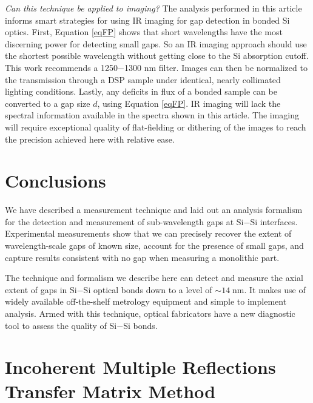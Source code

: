 \emph{Can this technique be applied to imaging?}  The analysis performed in this article informs smart strategies for using IR imaging for gap detection in bonded Si optics.  First, Equation \ref{eqFP} shows that short wavelengths have the most discerning power for detecting small gaps.  So an IR imaging approach should use the shortest possible wavelength without getting close to the Si absorption cutoff.  This work recommends a 1250$-$1300 nm filter.  Images can then be normalized to the transmission through a DSP sample under identical, nearly collimated lighting conditions.  Lastly, any deficits in flux of a bonded sample can be converted to a gap size $d$, using Equation \ref{eqFP}.  IR imaging will lack the spectral information available in the spectra shown in this article.  The imaging will require exceptional quality of flat-fielding or dithering of the images to reach the precision achieved here with relative ease.  

\section{Conclusions}
We have described a measurement technique and laid out an analysis formalism for the detection and measurement of sub-wavelength gaps at Si$-$Si interfaces.  Experimental measurements show that we can precisely recover the extent of wavelength-scale gaps of known size, account for the presence of small gaps, and capture results consistent with no gap when measuring a monolithic part.

The technique and formalism we describe here can detect and measure the axial extent of gaps in Si$-$Si optical bonds down to a level of $\sim14\;$nm.  It makes use of widely available off-the-shelf metrology equipment and simple to implement analysis.  Armed with this technique, optical fabricators have a new diagnostic tool to assess the quality of Si$-$Si bonds.



\section{Incoherent Multiple Reflections Transfer Matrix Method}
\label{sec:Append-IMRTMM}

